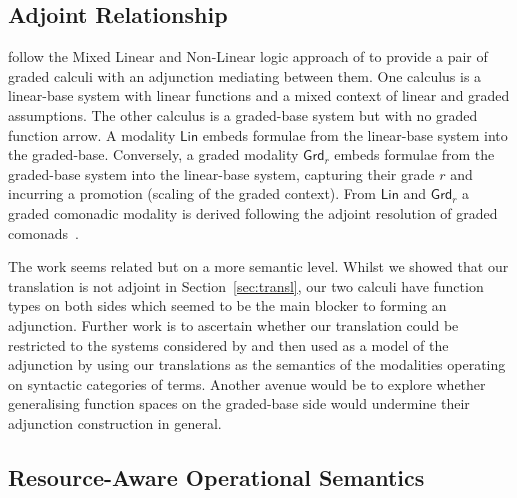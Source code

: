 \subsection{Adjoint Relationship}

\citet{DBLP:journals/corr/abs-2401-17199} follow
the Mixed Linear and Non-Linear logic approach of \citet{DBLP:conf/csl/Benton94}
to provide a pair of graded calculi with an adjunction mediating between them.
One calculus is a linear-base system with linear functions
and a mixed context of linear and graded assumptions. The other calculus
is a graded-base system but with no graded function arrow. A modality
$\mathsf{Lin}$ embeds formulae from the linear-base system into the graded-base. Conversely, a graded modality
$\mathsf{Grd}_r$ embeds formulae from the graded-base system into
the linear-base system, capturing their grade $r$ and incurring a promotion (scaling of
the graded context). From $\mathsf{Lin}$ and
$\mathsf{Grd}_r$ a graded comonadic modality is derived following the adjoint resolution of graded
comonads~\cite{DBLP:conf/fossacs/FujiiKM16}. %

The work seems related but on a more semantic level. Whilst we showed
that our translation is not adjoint in Section~\ref{sec:transl}, our two calculi have
function types on both sides which seemed to be the main blocker to forming an adjunction.
Further work is to ascertain whether our translation could
be restricted to the systems considered by \citet{DBLP:journals/corr/abs-2401-17199} and then used
as a model of the adjunction by using our
translations as the semantics of the modalities operating on
syntactic categories of terms. Another avenue
would be to explore whether generalising function spaces on the graded-base
side would undermine their adjunction construction in general.



\subsection{Resource-Aware Operational Semantics}
\label{sec:raos}

